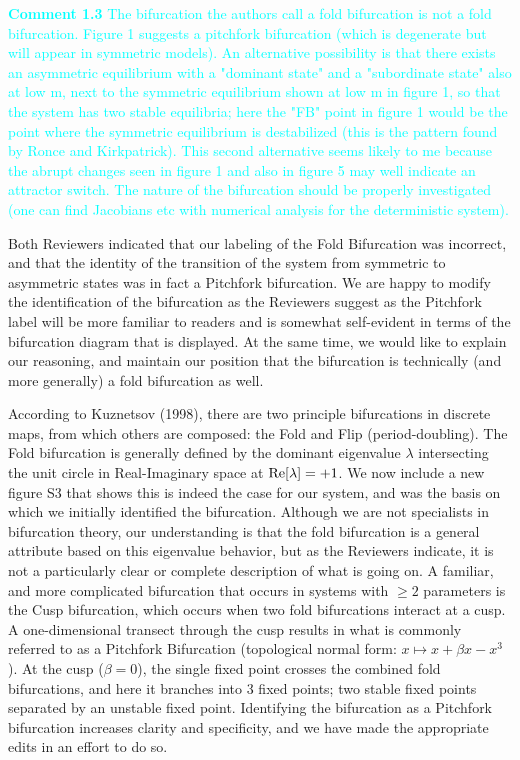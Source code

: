 \documentclass[ucm,12pt]{ucletter}
\begin{document}
\begin{letter}
\noindent \textcolor{cyan}{
{\bf Comment 1.3} The bifurcation the authors call a fold bifurcation is not a fold bifurcation. Figure 1 suggests a pitchfork bifurcation (which is degenerate but will appear in symmetric models). An alternative possibility is that there exists an asymmetric equilibrium with a "dominant state" and a "subordinate state" also at low m, next to the symmetric equilibrium shown at low m in figure 1, so that the system has two stable equilibria; here the "FB" point in figure 1 would be the point where the symmetric equilibrium is destabilized (this is the pattern found by Ronce and Kirkpatrick). This second alternative seems likely to me because the abrupt changes seen in figure 1 and also in figure 5 may well indicate an attractor switch. The nature of the bifurcation should be properly investigated (one can find Jacobians etc with numerical analysis for the deterministic system).
}

 Both Reviewers indicated that our labeling of the Fold Bifurcation was incorrect, and that the identity of the transition of the system from symmetric to asymmetric states was in fact a Pitchfork bifurcation. We are happy to modify the identification of the bifurcation as the Reviewers suggest as the Pitchfork label will be more familiar to readers and is somewhat self-evident in terms of the bifurcation diagram that is displayed. At the same time, we would like to explain our reasoning, and maintain our position that the bifurcation is technically (and more generally) a fold bifurcation as well.

According to Kuznetsov (1998), there are two principle bifurcations in discrete maps, from which others are composed: the Fold and Flip (period-doubling).
The Fold bifurcation is generally defined by the dominant eigenvalue $\lambda$ intersecting the unit circle in Real-Imaginary space at ${\rm Re}[\lambda]=+1$.
We now include a new figure S3 that shows this is indeed the case for our system, and was the basis on which we initially identified the bifurcation. Although we are not specialists in bifurcation theory, our understanding is that the fold bifurcation is a general attribute based on this eigenvalue behavior, but as the Reviewers indicate, it is not a particularly clear or complete description of what is going on. 
A familiar, and more complicated bifurcation that occurs in systems with $\geq2$ parameters is the Cusp bifurcation, which occurs when two fold bifurcations interact at a cusp.
A one-dimensional transect through the cusp results in what is commonly referred to as a Pitchfork Bifurcation (topological normal form: $x \mapsto x + \beta x - x^3$). At the cusp ($\beta=0$), the single fixed point crosses the combined fold bifurcations, and here it branches into 3 fixed points; two stable fixed points separated by an unstable fixed point.
Identifying the bifurcation as a Pitchfork bifurcation increases clarity and specificity, and we have made the appropriate edits in an effort to do so.


\end{letter}
\end{document}
